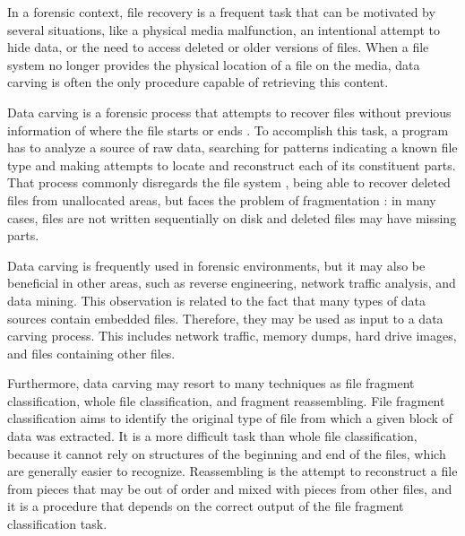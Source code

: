 In a forensic context, file recovery is a frequent task that can be motivated by several situations, like a physical media malfunction, an intentional attempt to hide data, or the need to access deleted or older versions of files. When a file system no longer provides the physical location of a file on the media, data carving is often the only procedure capable of retrieving this content.

Data carving is a forensic process that attempts to recover files without previous information of where the file starts or ends \cite{garfinkel_carving_2007}.
To accomplish this task, a program has to analyze a source of raw data, searching for patterns indicating a known file type and making attempts to locate and reconstruct each of its constituent parts.
That process commonly disregards the file system \cite{veenman_statistical_2007}, being able to recover deleted files from unallocated areas, but faces the problem of fragmentation \cite{veenman_statistical_2007}  \cite{pal_evolution_2009}: in many cases, files are not written sequentially on disk and deleted files may have missing parts.

Data carving is frequently used in forensic environments, but it may also be beneficial in other areas, such as reverse engineering, network traffic analysis, and data mining.
This observation is related to the fact that many types of data sources contain embedded files. Therefore, they may be used as input to a data carving process. This includes network traffic, memory dumps, hard drive images, and files containing other files.


Furthermore, data carving may resort to many techniques as file fragment classification, whole file classification, and fragment reassembling.
File fragment classification aims to identify the original type of file from which a given block of data was extracted. It is a more difficult task than whole file classification, because it cannot rely on structures of the beginning and end of the files, which are generally easier to recognize. Reassembling is the attempt to reconstruct a file from pieces that may be out of order and mixed with pieces from other files, and it is a procedure that depends on the correct output of the file fragment classification task.
